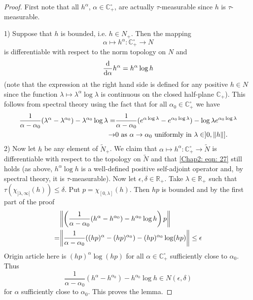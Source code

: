 \begin{proof}
    First note that all $h^\alpha$, $\alpha\in \mathbb{C}_+^\circ$, are actually $\tau$-measurable since $h$ is $\tau$-measurable.\par
1) Suppose that $h$ is bounded, i.e. $h\in N_+$. Then the mapping
\[
    \alpha\mapsto h^\alpha:\mathbb{C}_+^\circ\to N
\] 
is differentiable with respect to the norm topology on $N$ and 
\begin{equation}\label{Chap2: eqn: 27}
    \dv{\alpha}h^\alpha=h^\alpha \log h
\end{equation}
(note that the expression at the right hand side is defined for any positive $h\in N$ since the function $\lambda\mapsto \lambda^\alpha \log \lambda$ is continuous on the closed half-plane $\mathbb{C}_+$). This follows from spectral theory using the fact that for all $\alpha_0\in \mathbb{C}_+^\circ$ we have 
\[
    \begin{split}
        \frac{1}{\alpha-\alpha_0}(\lambda^\alpha-\lambda^{\alpha_0})-\lambda^{\alpha_0}\log \lambda=&\frac{1}{\alpha-\alpha_0}(e^{\alpha\log \lambda}-e^{\alpha_0\log \lambda})-\log \lambda e^{\alpha_0\log \lambda}\\
        \to& 0 \text{ as $\alpha\to \alpha_0$ uniformly in $\lambda\in]0,\norm{h}]$.}
    \end{split}
\]
2) Now let $h$ be any element of $\tilde{N}_+$. We claim that $\alpha\mapsto h^\alpha:\mathbb{C}_+^\circ \to \tilde{N}$ is differentiable with respect to the topology on $\tilde{N}$ and that \eqref{Chap2: eqn: 27} still holds (as above, $h^\alpha\log h$ is a well-defined positive self-adjoint operator and, by spectral theory, it is $\tau$-measurable). Now let $\epsilon,\delta\in \mathbb{R}_+$. Take $\lambda\in \mathbb{R}_+$ such that $\tau(\chi_{]\lambda,\infty[}(h))\leq \delta$. Put $p=\chi_{[0,\lambda]}(h)$. Then $hp$ is bounded and by the first part of the proof 
\[
    \begin{split}
        &\norm{\left( \frac{1}{\alpha-\alpha_0}(h^\alpha-h^{\alpha_0})-h^{\alpha_0}\log h \right)p}\\
        =&\norm{ \frac{1}{\alpha-\alpha_0}((hp)^\alpha-(hp)^{\alpha_0})-(hp)^{\alpha_0}\log (hp) }\leq \epsilon
    \end{split}
\]
{\color{red} Origin article here is $(hp)^{\alpha}\log (hp)$} for all $\alpha\in \mathbb{C}_+^\circ$ sufficiently close to $\alpha_0$. Thus
\[
     \frac{1}{\alpha-\alpha_0}(h^\alpha-h^{\alpha_0})-h^{\alpha_0}\log h \in N(\epsilon,\delta)
\] 
for $\alpha$ sufficiently close to $\alpha_0$. This proves the lemma.
\end{proof}
